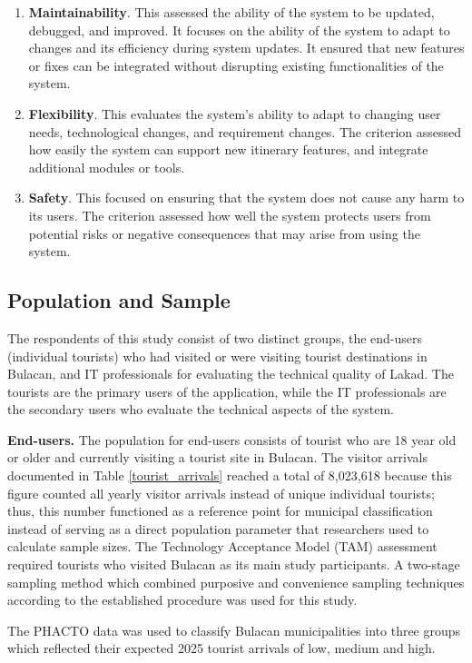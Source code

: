 \begin{enumerate}
	\item \textbf{Maintainability}. This assessed the ability of the system to be updated, debugged, and improved. It focuses on the ability of the system to adapt to changes and its efficiency during system updates. It ensured that new features or fixes can be integrated without disrupting existing functionalities of the system.
	\item \textbf{Flexibility}. This evaluates the system’s ability to adapt to changing user needs, technological changes, and requirement changes. The criterion assessed how easily the system can support new itinerary features, and integrate additional modules or tools.
	\item \textbf{Safety}. This focused on ensuring that the system does not cause any harm to its users. The criterion assessed how well the system protects users from potential risks or negative consequences that may arise from using the system.
\end{enumerate}

\subsection{Population and Sample}

The respondents of this study consist of two distinct groups, the end-users (individual tourists) who had visited or were visiting tourist destinations in Bulacan, and IT professionals for evaluating the technical quality of Lakad. The tourists are the primary users of the application, while the IT professionals are the secondary users who evaluate the technical aspects of the system. 


\textbf{End-users.} The population for end-users consists of tourist who are 18 year old or older and currently visiting a tourist site in Bulacan. The visitor arrivals documented in Table \ref{tourist_arrivals} reached a total of 8,023,618 because this figure counted all yearly visitor arrivals instead of unique individual tourists; thus, this number functioned as a reference point for municipal classification instead of serving as a direct population parameter that researchers used to calculate sample sizes. The Technology Acceptance Model (TAM) assessment required tourists who visited Bulacan as its main study participants. A two-stage sampling method which combined purposive and convenience sampling techniques according to the established procedure was used for this study.

The PHACTO data was used to classify Bulacan municipalities into three groups which reflected their expected 2025 tourist arrivals of low, medium and high.

